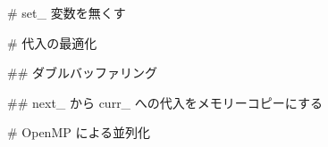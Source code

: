 # set_ 変数を無くす



# 代入の最適化




## ダブルバッファリング






## next_ から curr_ への代入をメモリーコピーにする







# OpenMP による並列化





